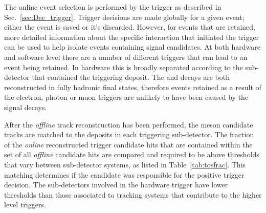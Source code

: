 The online event selection is performed by the \lhcb trigger as described in Sec.~\ref{sec:Dec_trigger}.
Trigger decisions are made globally for a given event; either the event is saved or it's discarded. However, for events that are retained, more detailed information about the specific interaction that initiated the trigger can be used to help isolate events containing signal candidates. At both hardware and software level there are a number of different triggers that can lead to an event being retained. In hardware this is broadly separated according to the sub-detector that contained the triggering deposit. 
The \decay{\Bp}{\Dsp\Kp\Km} and \decay{\Bp}{\Dsp}{\phiz} decays are both reconstructed in fully hadronic final states, therefore events retained as a result of the electron, photon or muon triggers are unlikely to have been caused by the signal decays. 

After the \emph{offline} track reconstruction has been performed, the \Bp meson candidate tracks are matched to the deposits in each triggering sub-detector.
The fraction of the \emph{online} reconstructed trigger candidate hits that are contained within the set of all \emph{offline} \Bp candidate hits are compared and required to be above thresholds that vary between sub-detector systems, as listed in Table~\ref{tab:tosfrac}. This matching determines if the candidate was responsible for the positive trigger decision. The sub-detectors involved in the hardware trigger have lower thresholds than those associated to tracking systems that contribute to the higher level triggers.  




